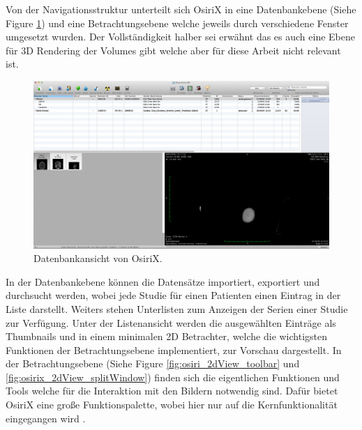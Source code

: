 Von der Navigationsstruktur unterteilt sich OsiriX in eine Datenbankebene (Siehe Figure \ref{fig:osirix_db_view}) und eine Betrachtungsebene welche jeweils durch verschiedene Fenster umgesetzt wurden.
Der Vollständigkeit halber sei erwähnt das es auch eine Ebene für 3D Rendering der Volumes gibt welche aber für diese Arbeit nicht relevant ist.
\begin{figure}[t]
	\centering
	\includegraphics[width=0.8\linewidth]{img/c2_osirix_db_view.jpg}
	\caption{Datenbankansicht von OsiriX.}
	\label{fig:osirix_db_view}
\end{figure}
In der Datenbankebene können die Datensätze importiert, exportiert und durchsucht werden, wobei jede Studie für einen Patienten einen Eintrag in der Liste darstellt.
Weiters stehen Unterlisten zum Anzeigen der Serien einer Studie zur Verfügung.
Unter der Listenansicht werden die ausgewählten Einträge als Thumbnails und in einem minimalen 2D Betrachter,
welche die wichtigsten Funktionen der Betrachtungsebene implementiert, zur Vorschau dargestellt.
In der Betrachtungsebene (Siehe Figure \ref{fig:osiri_2dView_toolbar} und \ref{fig:osirix_2dView_splitWindow}) finden sich die eigentlichen Funktionen und Tools welche für die Interaktion mit den Bildern notwendig sind.
Dafür bietet OsiriX eine große Funktionspalette, wobei hier nur auf die Kernfunktionalität eingegangen wird \cite{osirix}.
